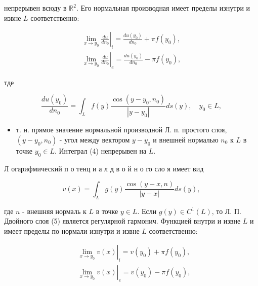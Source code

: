 \documentclass[10pt]{article}
\begin{document}
непрерывен всюду в $\mathbb{R}^{2}$. Его нормальная производная имеет пределы изнутри и извне $L$ соответственно:



\[

\begin{gathered}

\left.\lim _{x \rightarrow y_{0}} \frac{d u}{d n_{0}}\right|_{i}=\frac{d u\left(y_{0}\right)}{d n_{0}}+\pi f\left(y_{0}\right), \\

\left.\lim _{x \rightarrow y_{0}} \frac{d u}{d n_{0}}\right|_{e}=\frac{d u\left(y_{0}\right)}{d n_{0}}-\pi f\left(y_{0}\right),

\end{gathered}

\]



тде



\[

\frac{d u\left(y_{0}\right)}{d n_{0}}=\int_{L} f(y) \frac{\cos \left(y-y_{0}, n_{0}\right)}{\left|y-y_{0}\right|} d s(y), \quad y_{0} \in L,

\]



\begin{itemize}

  \item т. н. прямое значение нормальной производной Л. п. простого слоя, $\left(y-y_{0}, n_{0}\right)$ - угол между вектором $y-y_{0}$ и внешней нормалью $n_{0}$ к $L$ в точке $y_{0} \in L$. Интеграл (4) непрерывен на $L$.

\end{itemize}



Л огарифмический п о тенц и а л д в о й н о го сло я имеет вид



\[

v(x)=\int_{L} g(y) \frac{\cos (y-x, n)}{|y-x|} d s(y),

\]



где $n$ - внешняя нормаль к $L$ в точке $y \in L$. Если $g(y) \in C^{1}(L)$, то Л. П. Двойного слоя (5) является регулярной гармонич. Функцией внутри и извне $L$ и имеет пределы по нормали изнутри и извне $L$ соответственно:



\[

\begin{aligned}

& \left.\lim _{x \rightarrow y_{0}} v(x)\right|_{i}=v\left(y_{0}\right)+\pi f\left(y_{0}\right), \\

& \left.\lim _{x \rightarrow y_{0}} v(x)\right|_{e}=v\left(y_{0}\right)-\pi f\left(y_{0}\right),

\end{aligned}

\]
\end{document}
